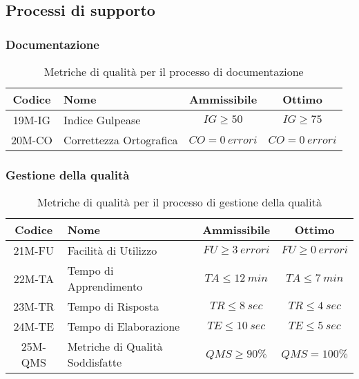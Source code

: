\newpage
\subsection{Processi di supporto}
\subsubsection{Documentazione}
\begin{table}[h!]
	\centering
	\begin{tabular}{ | c | l | c | c | }
		\hline
		Codice   & Nome                    & Ammissibile        & Ottimo             \\
		\hline
		19M-IG   & Indice Gulpease         & $IG \geq 50$       & $IG \geq 75$       \\
		20M-CO   & Correttezza Ortografica & $CO = 0\ errori$   & $CO = 0\ errori$   \\
		\hline
	\end{tabular}
	\caption{Metriche di qualità per il processo di documentazione}
\end{table}

\subsubsection{Gestione della qualità}
\begin{table}[h!]
	\centering
	\begin{tabular}{ | c | l | c | c | }
		\hline
		Codice   & Nome                           & Ammissibile         & Ottimo              \\
		\hline
		21M-FU  & Facilità di Utilizzo            & $FU \geq 3\ errori$ & $FU \geq 0\ errori$ \\
		22M-TA  & Tempo di Apprendimento	      & $TA \leq 12\ min$   & $TA \leq 7\ min$    \\
		23M-TR  & Tempo di Risposta		          & $TR \leq 8\ sec$    & $TR \leq 4\ sec$    \\
		24M-TE  & Tempo di Elaborazione		      & $TE \leq 10\ sec$   & $TE \leq 5\ sec$    \\
		25M-QMS & Metriche di Qualità Soddisfatte & $QMS \geq 90\%$     & $QMS = 100\%$       \\
		\hline
	\end{tabular}
	\caption{Metriche di qualità per il processo di gestione della qualità}
\end{table}


